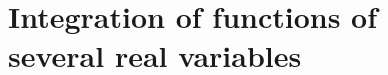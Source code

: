 \chapter[Integration of functions of several real variables]{Integration of functions of \\ several real variables}
\thispagestyle{noheaders}

